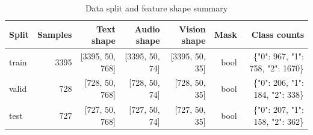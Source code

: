 \begin{table}[htbp]
\centering
\caption{Data split and feature shape summary}
\label{tab:q3_data_summary}
\begin{tabular}{lrrrrrr}
\toprule
Split & Samples & Text shape & Audio shape & Vision shape & Mask & Class counts \\
\midrule
train & 3395 & [3395, 50, 768] & [3395, 50, 74] & [3395, 50, 35] & bool & \{"0": 967, "1": 758, "2": 1670\} \\
valid & 728 & [728, 50, 768] & [728, 50, 74] & [728, 50, 35] & bool & \{"0": 206, "1": 184, "2": 338\} \\
test & 727 & [727, 50, 768] & [727, 50, 74] & [727, 50, 35] & bool & \{"0": 207, "1": 158, "2": 362\} \\
\bottomrule
\end{tabular}
\end{table}
